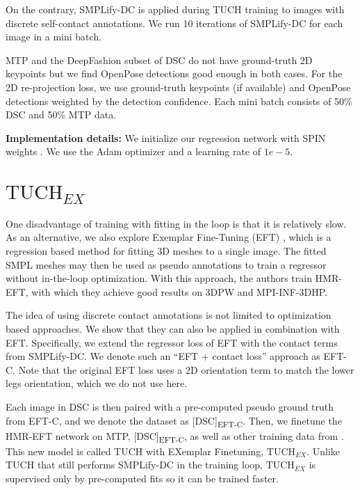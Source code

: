 \documentclass[final]{cvpr}
\newcommand{\smplifyxdc}{\mbox{SMPLify-DC}\xspace}
\theoremstyle{definition}
\begin{document}
On the contrary, \smplifyxdc is applied during TUCH training to images with discrete self-contact annotations. 
We run 10 iterations of \smplifyxdc for each image in a mini batch. 

MTP and the DeepFashion subset of DSC do not have ground-truth 2D keypoints but we find OpenPose detections good enough in both cases. 
For the 2D re-projection loss, we use ground-truth keypoints (if available) and OpenPose detections weighted by the detection confidence. Each mini batch consists of 50\% DSC and 50\% MTP data. 

\textbf{Implementation details:} We initialize our regression
network with SPIN weights \cite{kolotouros2019learning}. We use the Adam optimizer \cite{kingma2014adam} and a learning rate of $1e-5$. 

\section{$\text{TUCH}_{\mathit{EX}}$}

One disadvantage of training with fitting in the loop is that it is relatively slow. 
As an alternative, we also explore Exemplar Fine-Tuning (EFT) \cite{joo2020eft}, which is a regression based method for fitting 3D meshes to a single image. 
The fitted SMPL meshes may then be used as pseudo annotations to train a regressor without in-the-loop optimization. 
With this approach, the authors train HMR-EFT, with which they achieve good results on 3DPW and MPI-INF-3DHP.

The idea of using discrete contact annotations is not limited to optimization based approaches. We show that they can also be applied in combination with EFT. Specifically, we extend the regressor loss of EFT with the contact terms from \smplifyxdc. We denote such an ``EFT + contact loss'' approach as EFT-C. Note that the original EFT loss uses a 2D orientation term to match the lower legs orientation, which we do not use here.

Each image in DSC is then paired with a pre-computed pseudo ground truth from EFT-C, and we denote the dataset as [DSC]\textsubscript{EFT-C}. 
Then, we finetune the HMR-EFT network on MTP, [DSC]\textsubscript{EFT-C}, as well as other training data from \cite{joo2020eft}. This new model is called TUCH with EXemplar Finetuning, $\text{TUCH}_{\mathit{EX}}$. 
Unlike TUCH that still performs \smplifyxdc in the training loop, $\text{TUCH}_{\mathit{EX}}$ is supervised only by pre-computed fits so it can be trained faster.
\end{document}
